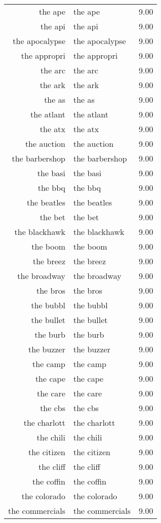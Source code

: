 \begin{table}[ht]
\begin{tabular}{rlr}
  the ape & the ape & 9.00 \\ 
  the api & the api & 9.00 \\ 
  the apocalypse & the apocalypse & 9.00 \\ 
  the appropri & the appropri & 9.00 \\ 
  the arc & the arc & 9.00 \\ 
  the ark & the ark & 9.00 \\ 
  the as & the as & 9.00 \\ 
  the atlant & the atlant & 9.00 \\ 
  the atx & the atx & 9.00 \\ 
  the auction & the auction & 9.00 \\ 
  the barbershop & the barbershop & 9.00 \\ 
  the basi & the basi & 9.00 \\ 
  the bbq & the bbq & 9.00 \\ 
  the beatles & the beatles & 9.00 \\ 
  the bet & the bet & 9.00 \\ 
  the blackhawk & the blackhawk & 9.00 \\ 
  the boom & the boom & 9.00 \\ 
  the breez & the breez & 9.00 \\ 
  the broadway & the broadway & 9.00 \\ 
  the bros & the bros & 9.00 \\ 
  the bubbl & the bubbl & 9.00 \\ 
  the bullet & the bullet & 9.00 \\ 
  the burb & the burb & 9.00 \\ 
  the buzzer & the buzzer & 9.00 \\ 
  the camp & the camp & 9.00 \\ 
  the cape & the cape & 9.00 \\ 
  the care & the care & 9.00 \\ 
  the cbs & the cbs & 9.00 \\ 
  the charlott & the charlott & 9.00 \\ 
  the chili & the chili & 9.00 \\ 
  the citizen & the citizen & 9.00 \\ 
  the cliff & the cliff & 9.00 \\ 
  the coffin & the coffin & 9.00 \\ 
  the colorado & the colorado & 9.00 \\ 
  the commercials & the commercials & 9.00 \\ 

\end{tabular}
\end{table}
